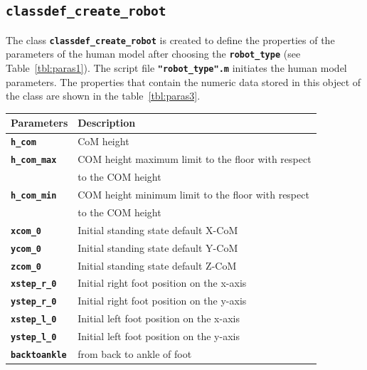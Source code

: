 \documentclass[12pt,oneside,notitlepage,abstracton,a4paper]{scrartcl}
\begin{document}
\subsection{\textbf{\texttt{classdef\_create\_robot}}} \label{cls_create_robot}  
The class \textbf{\texttt{classdef\_create\_robot}} is created to define the properties of the parameters of the human model after choosing the \textbf{\texttt{robot\_type}} (see Table~\ref{tbl:paras1}). The script file \textbf{\texttt{"robot\_type".m}} initiates the human model parameters. The properties that contain the numeric data stored in this object of the class are shown in the table~\ref{tbl:paras3}.  
\begin{table}[!htbp] 
\begin{center}
\begin{tabular}{|l|l|}
  \hline
  \rowcolor{green!25}\bf {\small Parameters}      & \bf {\small Description}  \\ \hline 
  \textbf{\texttt{h\_com}}          & CoM height\\ \hline 
  \textbf{\texttt{h\_com\_max}}          & COM height maximum limit to the floor with respect\\  
                                         & to the COM height\\ \hline
  \textbf{\texttt{h\_com\_min}}          & COM height minimum limit to the floor with respect\\  
                                         & to the COM height\\ \hline  
  \textbf{\texttt{xcom\_0}}          & Initial standing state default X-CoM\\ \hline
  \textbf{\texttt{ycom\_0}}          & Initial standing state default Y-CoM\\ \hline
  \textbf{\texttt{zcom\_0}}          & Initial standing state default Z-CoM\\ \hline
  \textbf{\texttt{xstep\_r\_0}}          &  Initial right foot position on the x-axis\\ \hline
  \textbf{\texttt{ystep\_r\_0}}          &  Initial right foot position on the y-axis\\ \hline
  \textbf{\texttt{xstep\_l\_0}}          &  Initial left foot position on the x-axis\\ \hline
  \textbf{\texttt{ystep\_l\_0}}          &  Initial left foot position on the y-axis\\ \hline
  \textbf{\texttt{backtoankle}}          & from back to ankle of foot\\ \hline

\end{tabular}
\end{center}
\end{table}
\end{document}
